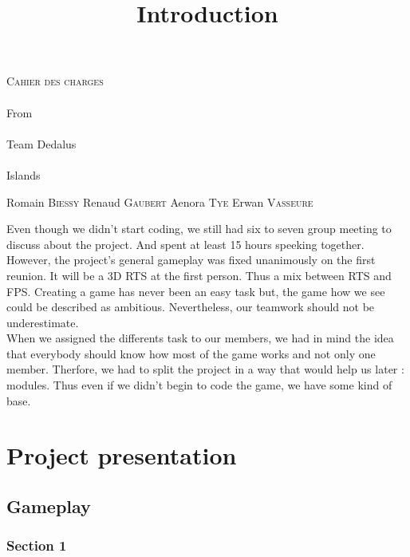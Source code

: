 \documentclass[article]{report}
\begin{document}
		\thispagestyle{empty}
  			\begin{titlepage} 
						\vspace*{5cm} 
  					\begin{center} 
  							{\huge{\textsc{Cahier des charges} \\ ~ \\{\large From}\\ ~\\ Team Dedalus \\ ~ \\ Islands}}
	  						\vspace*{11cm}
						\end{center}
  					\hfill {\large Romain \textsc{Biessy}}
  					\hfill {\large Renaud \textsc{Gaubert}}
  					\hfill {\large Aenora \textsc{Tye}}
  					\hfill {\large Erwan  \textsc{Vasseure}}
  			\end{titlepage} 
  	\renewcommand{\contentsname}{Sommaire}

  	\tableofcontents
  			\newpage
				\title{Introduction}%
								Even though we didn't start coding, we still had six to seven group meeting to discuss about the project. And spent at least 15 hours speeking together.\newline
								However, the project's general gameplay was fixed unanimously on the first reunion. It will be a 3D RTS at the first person. Thus a mix between RTS and FPS. Creating a game has never been an easy task but, the game how we see could be described as ambitious. Nevertheless, our teamwork should not be underestimate.\\
								
								When we assigned the differents task to our members, we had in mind the idea that everybody should know how most of the game works and not only one member. Therfore, we had to split the project in a way that would help us later : modules. Thus even if we didn't begin to code the game, we have some kind of base. 								
								
				\part{Project presentation}
      			\chapter{Gameplay}
								\section{Section 1}
\end{document}
